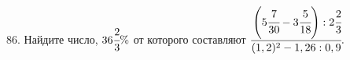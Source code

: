 86. Найдите число, $36\cfrac{2}{3}\%$ от которого составляют
$\cfrac{\left(5\cfrac{7}{30}-3\cfrac{5}{18}\right):2\cfrac{2}{3}}{(1,2)^2-1,26:0,9}.$\\
